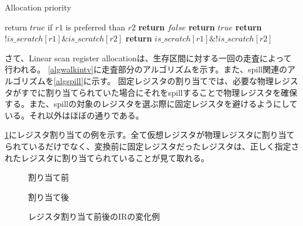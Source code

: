 \documentclass[uplatex,a4paper]{jsarticle}
\begin{document}
\begin{algorithm}
\caption{Allocation priority}\label{algcomprio}
\begin{algorithmic}[1]
  \Ensure return $true$ if $r1$ is preferred than $r2$
    \State \textbf{return} $false$
  \EndIf
    \State \textbf{return} $true$
  \EndIf
    \State \textbf{return} $\mathord{!}is\_scratch[r1] \mathbin{\&} is\_scratch[r2]$
  \Else
    \State \textbf{return} $is\_scratch[r1] \mathbin{\&} \mathord{!}is\_scratch[r2]$
  \EndIf
\EndFunction
\end{algorithmic}
\end{algorithm}

さて、Linear scan register allocationは、生存区間に対する一回の走査によって行われる。
\cref{algwalkintv}に走査部分のアルゴリズムを示す。また、spill関連のアルゴリズムを\cref{algspill}に示す。
固定レジスタの割り当てでは、必要な物理レジスタがすでに割り当てられていた場合にそれをspillすることで物理レジスタを確保する。また、spillの対象のレジスタを選ぶ際に固定レジスタを避けるようにしている。それ以外はほぼ\cite{poletto1999linear}の通りである。

\cref{ccc_alloc_fig}にレジスタ割り当ての例を示す。全て仮想レジスタが物理レジスタに割り当てられているだけでなく、変換前に固定レジスタだったレジスタは、正しく指定されたレジスタに割り当てられていることが見て取れる。

\begin{figure}[h]
  \begin{minipage}{0.50\hsize}
    \centering
    
    \caption*{割り当て前}
  \end{minipage}
  \begin{minipage}{0.50\hsize}
    \centering
    
    \caption*{割り当て後}
  \end{minipage}
  \caption{レジスタ割り当て前後のIRの変化例}
  \label{ccc_alloc_fig}
\end{figure}
\end{document}
